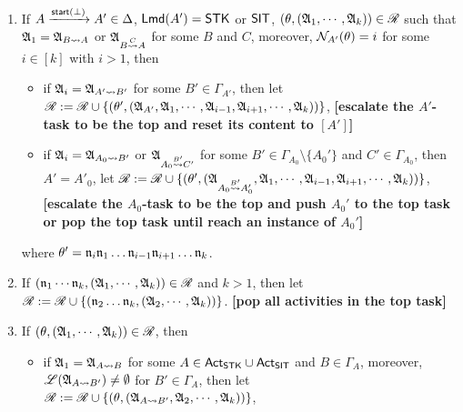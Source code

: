 {\begin{minipage}{\textwidth}
{\begin{enumerate}
    \item If $A \xrightarrow{{\mathsf{start} }(\bot)}A' \in\Delta$, ${\sf Lmd}(A')=\mathsf{STK}$ or ${\sf SIT}$, $(\theta, ({\mathfrak{A} }_1,\cdots,{\mathfrak{A} }_k)) \in \mathscr{R}$ such that 
    ${\mathfrak{A} }_1 = {\mathfrak{A} }_{B \rightsquigarrow A}$ or ${\mathfrak{A} }_{B \stackrel{C}{\rightsquigarrow} A}$ for some $B$ and $C$,
    moreover, $\mathcal{N}_{A'}(\theta) = i$ for some $i \in [k]$ with $i > 1$, then
    \begin{itemize}
        \item if ${\mathfrak{A} }_i = {\mathfrak{A} }_{A'\rightsquigarrow B'}$ for some $B' \in \Gamma_{A'}$,
        then let $\mathscr{R}:= \mathscr{R} \cup \{(\theta', ({\mathfrak{A} }_{A'}, {\mathfrak{A} }_1, \cdots,{\mathfrak{A} }_{i-1},{\mathfrak{A} }_{i+1},\cdots,{\mathfrak{A} }_{k}))\}$, 
        \textbf{[escalate the $A'$-task to be the top and reset its content to $[A']$]}
        \item if ${\mathfrak{A} }_i = {\mathfrak{A} }_{A_0\rightsquigarrow B'}$ or ${\mathfrak{A} }_{A_0 \stackrel{B'}{\rightsquigarrow} C'}$ for some $B' \in \Gamma_{A_0}\setminus\{A_0'\}$ and $C' \in \Gamma_{A_0}$,
        then $A' = A'_0$,  let 
        $\mathscr{R}:= \mathscr{R} \cup \{(\theta', ({\mathfrak{A} }_{A_0\stackrel{B'} {\rightsquigarrow} A_0'}, {\mathfrak{A} }_1, \cdots,{\mathfrak{A} }_{i-1},{\mathfrak{A} }_{i+1},\cdots,{\mathfrak{A} }_{k}))\}$,  
        \textbf{[escalate the $A_0$-task to be the top and push $A_0'$ to the top task or pop the top task until reach an instance of $A_0'$]}
    \end{itemize}
        where $\theta' = \mathfrak{n}_i\mathfrak{n}_1\dots\mathfrak{n}_{i-1}\mathfrak{n}_{i+1}\dots\mathfrak{n}_k$. 
    \item If $(\mathfrak{n}_1 \cdots \mathfrak{n}_k, ({\mathfrak{A} }_1,\cdots,{\mathfrak{A} }_k)) \in \mathscr{R}$ and $k>1$, then let $\mathscr{R} := \mathscr{R} \cup \{(\mathfrak{n}_2\dots\mathfrak{n}_k, ({\mathfrak{A} }_2,\cdots,{\mathfrak{A} }_k))\}$.
        \textbf{[pop all activities in the top task]}
%
    \item If $(\theta, ({\mathfrak{A} }_1,\cdots,{\mathfrak{A} }_k)) \in \mathscr{R}$, then
    \begin{itemize}
        \item if ${\mathfrak{A} }_1 = {\mathfrak{A} }_{A\rightsquigarrow B}$ for some $A\in{\sf Act}_{\mathsf{STK}}\cup{\sf Act}_{\mathsf{SIT}}$ and $B \in \Gamma_A$, moreover, ${\mathscr{L} }({\mathfrak{A} }_{A\rightsquigarrow B'}) \neq \emptyset$ for $B'  \in \Gamma_A$, then let $\mathscr{R} := \mathscr{R} \cup \{(\theta, ({\mathfrak{A} }_{A\rightsquigarrow B'}, {\mathfrak{A} }_2,\cdots,{\mathfrak{A} }_k))\}$,
      

\end{itemize}
\end{enumerate}}
\end{minipage}}
